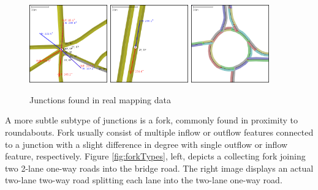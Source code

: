 \begin{figure}[h]
    \caption{Junctions found in real mapping data}
    \label{fig:junctionTypes}
    \centering
    \includegraphics[width=0.3\textwidth]{figs/junction/junction_5_roads.png}
    \hspace{0.2em}
    \includegraphics[width=0.3\textwidth]{figs/junction/junction_two_roads.png}
    \hspace{0.2em}
    \includegraphics[width=0.3\textwidth]{figs/junction/roundabout.png}
\end{figure}

A more subtle subtype of junctions is a fork, commonly found in proximity to roundabouts. Fork usually consist of multiple inflow or outflow features connected to a junction with a slight difference in degree with single outflow or inflow feature, respectively. Figure \ref{fig:forkTypes}, left, depicts a collecting fork joining two 2-lane one-way roads into the bridge road. The right image displays an actual two-lane two-way road splitting each lane into the two-lane one-way road.

